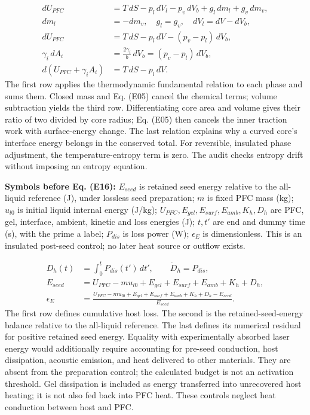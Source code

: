 \documentclass[10pt,a4paper]{article}
\begin{document}
{\small\begin{align*}
dU_{PFC}&=T\,dS-p_l\,dV_l-p_v\,dV_b+g_l\,dm_l+g_v\,dm_v,\\
dm_l&=-dm_v,\quad g_l=g_v,\quad dV_l=dV-dV_b,\\
dU_{PFC}&=T\,dS-p_l\,dV-(p_v-p_l)\,dV_b,\\
\gamma_i\,dA_i&=\frac{2\gamma_i}{b}\,dV_b=(p_v-p_l)\,dV_b,\\
d(U_{PFC}+\gamma_i A_i)&=T\,dS-p_l\,dV. \tag{E15}
\end{align*}}
The first row applies the thermodynamic fundamental relation to each phase and sums them. Closed mass and Eq. (E05) cancel the chemical terms; volume subtraction yields the third row. Differentiating core area and volume gives their ratio of two divided by core radius; Eq. (E05) then cancels the inner traction work with surface-energy change. The last relation explains why a curved core's interface energy belongs in the conserved total. For reversible, insulated phase adjustment, the temperature-entropy term is zero. The audit checks entropy drift without imposing an entropy equation.

\textbf{Symbols before Eq. (E16):} $E_{seed}$ is retained seed energy relative to the all-liquid reference (J), under lossless seed preparation; $m$ is fixed PFC mass (kg); $u_{l0}$ is initial liquid internal energy (J/kg); $U_{PFC},E_{gel},E_{surf},E_{amb},K_h,D_h$ are PFC, gel, interface, ambient, kinetic and loss energies (J); $t,t'$ are end and dummy time (s), with the prime a label; $P_{dis}$ is loss power (W); $\epsilon_E$ is dimensionless. This is an insulated post-seed control; no later heat source or outflow exists.

{\small\begin{align*}
D_h(t)&=\int_0^t P_{dis}(t')\,dt',\qquad \dot D_h=P_{dis},\\
E_{seed}&=U_{PFC}-m u_{l0}+E_{gel}+E_{surf}+E_{amb}+K_h+D_h,\\
\epsilon_E&=\frac{U_{PFC}-m u_{l0}+E_{gel}+E_{surf}+E_{amb}+K_h+D_h-E_{seed}}{E_{seed}}. \tag{E16}
\end{align*}}
The first row defines cumulative host loss. The second is the retained-seed-energy balance relative to the all-liquid reference. The last defines its numerical residual for positive retained seed energy. Equality with experimentally absorbed laser energy would additionally require accounting for pre-seed conduction, host dissipation, acoustic emission, and heat delivered to other materials. They are absent from the preparation control; the calculated budget is not an activation threshold. Gel dissipation is included as energy transferred into unrecovered host heating; it is not also fed back into PFC heat. These controls neglect heat conduction between host and PFC.
\end{document}
